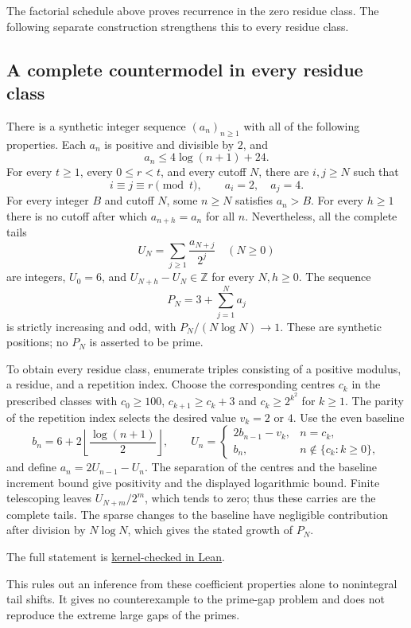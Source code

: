 The factorial schedule above proves recurrence in the zero residue class.
The following separate construction strengthens this to every residue class.


\subsection{A complete countermodel in every residue class}
\label{long251:res:all-residue-log-countermodel}
There is a synthetic integer sequence $(a_n)_{n\ge1}$ with all of the
following properties.  Each $a_n$ is positive and divisible by $2$, and
\[
 a_n\le 4\log(n+1)+24.
\]
For every $t\ge1$, every $0\le r<t$, and every cutoff $N$, there are
$i,j\ge N$ such that
\[
 i\equiv j\equiv r\pmod t,\qquad a_i=2,\quad a_j=4.
\]
For every integer $B$ and cutoff $N$, some $n\ge N$ satisfies $a_n>B$.
For every $h\ge1$ there is no cutoff after which $a_{n+h}=a_n$ for all $n$.
Nevertheless, all the complete tails
\[
 U_N=\sum_{j\ge1}\frac{a_{N+j}}{2^j}\quad(N\ge0)
\]
are integers, $U_0=6$, and $U_{N+h}-U_N\in\mathbb Z$ for every $N,h\ge0$.
The sequence
\[
 P_N=3+\sum_{j=1}^{N}a_j
\]
is strictly increasing and odd, with $P_N/(N\log N)\to1$.
These are synthetic positions; no $P_N$ is asserted to be prime.

To obtain every residue class, enumerate triples consisting of a positive
modulus, a residue, and a repetition index.  Choose the corresponding
centres $c_k$ in the prescribed classes with $c_0\ge100$,
$c_{k+1}\ge c_k+3$ and $c_k\ge2^{k^2}$ for $k\ge1$.
The parity of the repetition index selects the desired value $v_k=2$ or $4$.
Use the even baseline
\[
 b_n=6+2\left\lfloor\frac{\log(n+1)}2\right\rfloor,
 \qquad
 U_n=\begin{cases}2b_{n-1}-v_k,&n=c_k,\\b_n,&n\notin\{c_k:k\ge0\},\end{cases}
\]
and define $a_n=2U_{n-1}-U_n$.  The separation of the centres and the
baseline increment bound give positivity and the displayed logarithmic
bound.  Finite telescoping leaves $U_{N+m}/2^m$, which tends to zero;
thus these carries are the complete tails.  The sparse changes to the
baseline have negligible contribution after division by $N\log N$,
which gives the stated growth of $P_N$.

The full statement is \href{https://github.com/wcook04/plectis-erdos/blob/d4fed71423840f70f10edf27b9ad27c22fc4f49a/ErdosProblems/Erdos251/AllResidueLogarithmicR9.lean#L503}{kernel-checked in Lean}.


This rules out an inference from these coefficient properties alone to
nonintegral tail shifts.  It gives no counterexample to the prime-gap problem
and does not reproduce the extreme large gaps of the primes.

